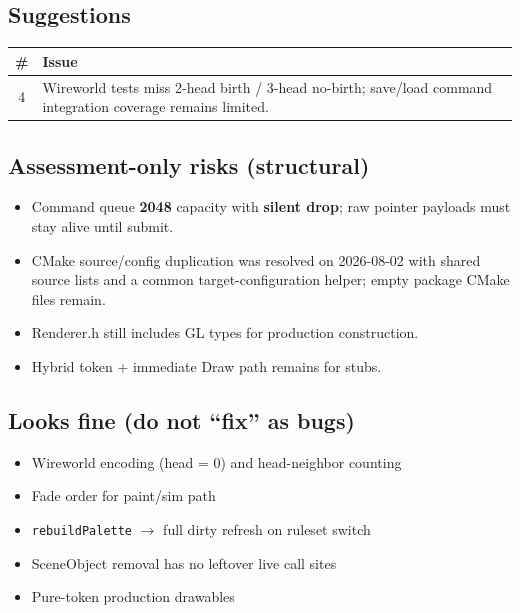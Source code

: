 \documentclass[10pt,a4paper]{article}
\begin{document}
\subsection{Suggestions}
\begin{table}[h!]
\centering
\small
\begin{tabularx}{\textwidth}{c X}
\toprule
\textbf{\#} & \textbf{Issue} \\
\midrule
4 & Wireworld tests miss 2-head birth / 3-head no-birth; save/load command integration coverage remains limited. \\
\bottomrule
\end{tabularx}
\end{table}

\subsection{Assessment-only risks (structural)}
\begin{itemize}
    \item Command queue \textbf{2048} capacity with \textbf{silent drop}; raw pointer payloads must stay alive until submit.
    \item CMake source/config duplication was resolved on 2026-08-02 with shared source lists and a common target-configuration helper; empty package CMake files remain.
    \item Renderer.h still includes GL types for production construction.
    \item Hybrid token + immediate Draw path remains for stubs.
\end{itemize}

\subsection{Looks fine (do not ``fix'' as bugs)}
\begin{itemize}
    \item Wireworld encoding (head = 0) and head-neighbor counting
    \item Fade order for paint/sim path
    \item \texttt{rebuildPalette} $\rightarrow$ full dirty refresh on ruleset switch
    \item SceneObject removal has no leftover live call sites
    \item Pure-token production drawables
\end{itemize}

\end{document}
